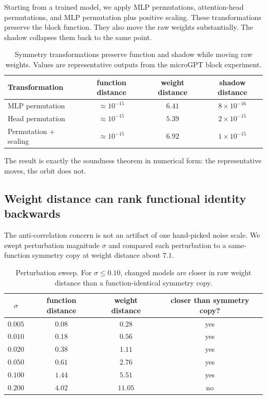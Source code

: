 \documentclass[11pt]{article}
\begin{document}
Starting from a trained model, we apply MLP permutations, attention-head permutations, and MLP permutation plus positive scaling. These transformations preserve the block function. They also move the raw weights substantially. The shadow collapses them back to the same point.

\begin{table}[h]
\centering
\caption{Symmetry transformations preserve function and shadow while moving raw weights. Values are representative outputs from the microGPT block experiment.}
\label{tab:soundness}
\begin{tabular}{lccc}
\toprule
Transformation & function distance & weight distance & shadow distance\\
\midrule
MLP permutation & $\approx 10^{-15}$ & $6.41$ & $8\times 10^{-16}$\\
Head permutation & $\approx 10^{-15}$ & $5.39$ & $2\times 10^{-15}$\\
Permutation + scaling & $\approx 10^{-15}$ & $6.92$ & $1\times 10^{-15}$\\
\bottomrule
\end{tabular}
\end{table}

The result is exactly the soundness theorem in numerical form: the representative moves, the orbit does not.

\subsection{Weight distance can rank functional identity backwards}

The anti-correlation concern is not an artifact of one hand-picked noise scale. We swept perturbation magnitude $\sigma$ and compared each perturbation to a same-function symmetry copy at weight distance about $7.1$.

\begin{table}[h]
\centering
\caption{Perturbation sweep. For $\sigma\leq 0.10$, changed models are closer in raw weight distance than a function-identical symmetry copy.}
\label{tab:sweep}
\begin{tabular}{cccc}
\toprule
$\sigma$ & function distance & weight distance & closer than symmetry copy?\\
\midrule
$0.005$ & $0.08$ & $0.28$ & yes\\
$0.010$ & $0.18$ & $0.56$ & yes\\
$0.020$ & $0.38$ & $1.11$ & yes\\
$0.050$ & $0.61$ & $2.76$ & yes\\
$0.100$ & $1.44$ & $5.51$ & yes\\
$0.200$ & $4.02$ & $11.05$ & no\\
\bottomrule
\end{tabular}
\end{table}
\end{document}
